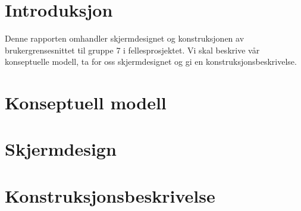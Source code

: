 \documentclass{article}
\begin{document}

\section{Introduksjon}
Denne rapporten omhandler skjermdesignet og konstruksjonen av brukergrensesnittet til gruppe 7 i fellesprosjektet. Vi skal beskrive vår konseptuelle modell, ta for oss skjermdesignet og gi en konstruksjonsbeskrivelse. 

\section{Konseptuell modell}



\section{Skjermdesign}




\section{Konstruksjonsbeskrivelse}
\end{document}
